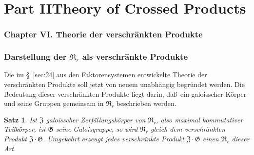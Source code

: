 \documentclass[12pt,a4paper]{article}
\theoremstyle{plain}
\newtheorem{satz}{Satz}[section]
\theoremstyle{definition}
\theoremstyle{remark}
\begin{document}
\newpage
\part*{Part II\hspace{1em}Theory of Crossed Products}

\section*{Chapter VI. Theorie der verschr\"ankten Produkte}

\section{Darstellung der $\mathfrak{R}_{r}$ als verschr\"ankte Produkte}\label{sec:27}

Die im \S~\ref{sec:24} aus den Faktorensystemen entwickelte Theorie der
verschr\"ankten Produkte soll jetzt von neuem unabh\"angig begr\"undet
werden. Die Bedeutung dieser verschr\"ankten Produkte liegt darin, da\ss\ ein galoisscher K\"orper und seine Gruppen gemeinsam in $\mathfrak{R}_{r}$
beschrieben werden.

\begin{satz}\label{satz:27-1}
Ist $\mathfrak{Z}$ galoisscher Zerf\"allungsk\"orper von $\mathfrak{R}_{r}$, also maximal
kommutativer Teilk\"orper, ist $\mathfrak{G}$ seine Galoisgruppe, so wird
$\mathfrak{R}_{r}$ gleich dem verschr\"ankten Produkt $\mathfrak{Z} \cdot \mathfrak{G}$. Umgekehrt
erzeugt jedes verschr\"ankte Produkt $\mathfrak{Z} \cdot \mathfrak{G}$ einen $\mathfrak{R}_{r}$ dieser Art.
\end{satz}
\end{document}
